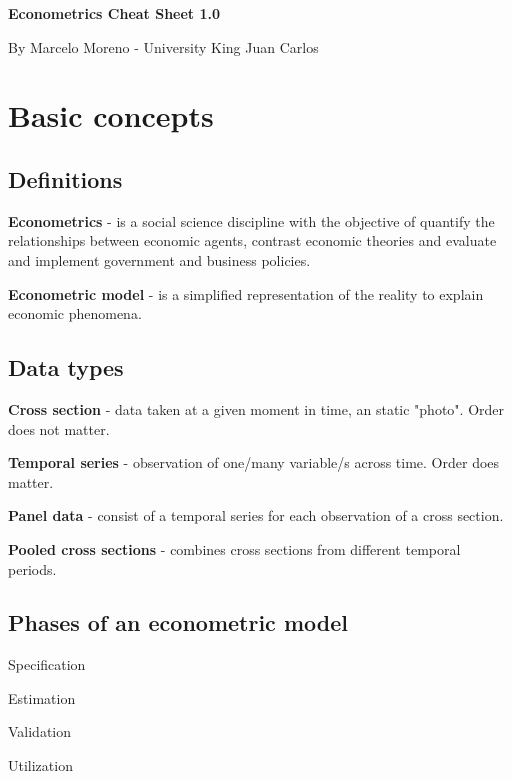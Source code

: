 \documentclass[10pt,landscape]{article}
\begin{document}
\begin{multicols}{3} %

\textbf{\Large Econometrics Cheat Sheet 1.0}

\begin{scriptsize}
By Marcelo Moreno - University King Juan Carlos
\end{scriptsize}

\section*{Basic concepts}
\subsection*{Definitions}

\textbf{Econometrics} - is a social science discipline with the objective of quantify the relationships between economic agents, contrast economic theories and evaluate and implement government and business policies.

\textbf{Econometric model} - is a simplified representation of the reality to explain economic phenomena.

\subsection*{Data types}

\textbf{Cross section} - data taken at a given moment in time, an static "photo". Order does not matter.

\textbf{Temporal series} - observation of one/many variable/s across time. Order does matter.

\textbf{Panel data} - consist of a temporal series for each observation of a cross section.

\textbf{Pooled cross sections} - combines cross sections from different temporal periods.

\subsection*{Phases of an econometric model}

\begin{enumerate}[leftmargin=*]
\setlength{\multicolsep}{0pt}
\begin{multicols}{2}
\item Specification
\item Estimation
\columnbreak
\item Validation
\item Utilization
\end{multicols}
\end{enumerate}


\end{multicols}
\end{document}
